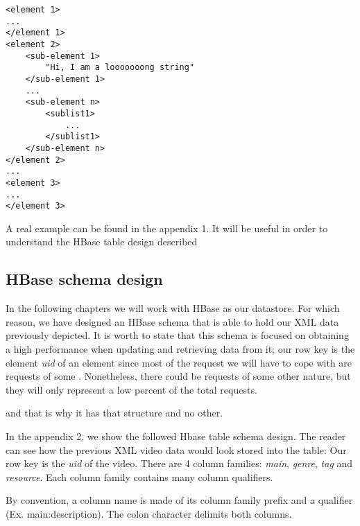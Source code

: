 \lstset{language=XML, basicstyle=\footnotesize, numbers=left, breaklines=true}
\begin{lstlisting}
<element 1>
...
</element 1>
<element 2>
	<sub-element 1>
		"Hi, I am a looooooong string"
	</sub-element 1>
	...
	<sub-element n>
		<sublist1>
			...
		</sublist1>
	</sub-element n>
</element 2>
...
<element 3>
...
</element 3>
\end{lstlisting}

\bigskip

A real example can be found in the appendix 1. It will be useful in order to understand the HBase table design described 

\subsection{HBase schema design}

In the following chapters we will work with HBase as our datastore. For which reason, we have designed an HBase schema that is able to hold our XML data previously depicted. It is worth to state that this schema is focused on obtaining a high performance when updating and retrieving data from it; our row key is the element \textit{uid} of an element since most of the request we will have to cope with are requests of some \cite{uids}. Nonetheless, there could be requests of some other nature, but they will only represent a low percent of the total requests.

 and that is why it has that structure and no other.
\par
In the appendix 2, we show the followed Hbase table schema design. The reader can see how the previous XML video data would look stored into the table: Our row key is the \textit{uid} of the video. There are 4 column families: \textit{main}, \textit{genre}, \textit{tag} and \textit{resource}. Each column family contains many column qualifiers.
\par
By convention, a column name is made of its column family prefix and a qualifier (Ex. main:description). The colon character delimits both columns.



